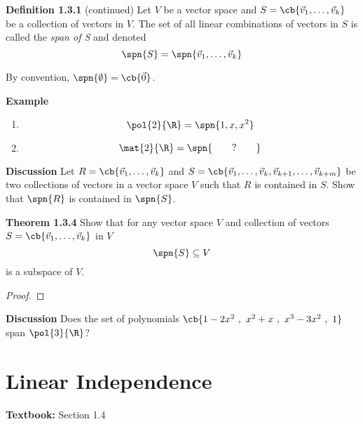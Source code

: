 \documentclass[letterpaper, 10pt]{article}
\begin{document}
\lb
\textbf{Definition 1.3.1} (continued)
\lb
Let $V$ be a vector space and $S = \cb{\vec v_1, \ldots, \vec v_k}$ be a collection of vectors
in $V$. The set of all linear combinations of vectors in $S$ is called the \emph{span of S}
and denoted
\[ \spn{S} = \spn{\vec v_1, \ldots, \vec v_k} \]

\pr
By convention, $\spn{\emptyset} = \cb{\vec 0}$.


\lb
\textbf{Example}
\lb
\begin{enumerate}
    \item \[ \pol{2}{\R} = \spn{1, x, x^2} \]
    \item \[ \mat{2}{\R} = \spn{\qquad ? \qquad } \]
\end{enumerate}


\newpage
\lb
\textbf{Discussion}
\lb
Let $R = \cb{\vec v_1, \ldots, \vec v_k}$ and
$S = \cb{\vec v_1, \ldots, \vec v_k, \vec v_{k+1}, \ldots, \vec v_{k+m}}$ be two collections
of vectors in a vector space $V$ such that $R$ is contained in $S$.
Show that $\spn{R}$ is contained in $\spn{S}$.


\vspace{300pt}


\lb
\textbf{Theorem 1.3.4}
\lb
Show that for any vector space $V$ and collection of vectors
$S = \cb{\vec v_1, \ldots, \vec v_k}$ in $V$
\[ \spn{S} \subseteq V\] is a subspace of $V$.
\begin{proof}
    
\end{proof}











\newpage
\lb
\textbf{Discussion}
\lb
Does the set of polynomials $ \cb{1-2x^2~,~ x^2 + x ~,~ x^3 - 3x^2 ~,~ 1}$ span $\pol{3}{\R}$?





\newpage
\section*{Linear Independence}%
\label{sec:Linear Independence}

\textbf{Textbook:} Section 1.4
\end{document}
